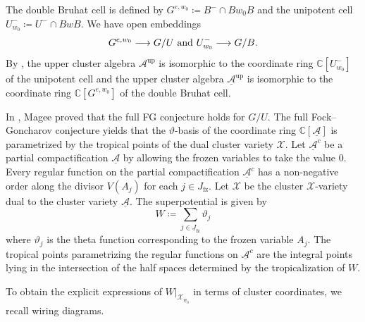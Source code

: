 \documentclass[11pt]{amsart}
\theoremstyle{plain}
\theoremstyle{definition}
\theoremstyle{remark}
\newcommand{\C}{\mathbb{C}}
\numberwithin{equation}{section} \numberwithin{table}{section}
\def\to{\mathchoice{\longrightarrow}{\rightarrow}{\rightarrow}{\rightarrow}}
\numberwithin{equation}{section}
\begin{document}
The double Bruhat cell is defined by $G^{e, w_0} \coloneqq B^{-} \cap Bw_0B$ and the unipotent cell $U^-_{w_0} \coloneqq U^{-} \cap BwB$. We have open embeddings
$$
G^{e, w_0} \to G / U \mbox{ and } U^-_{w_0} \to G / B.
$$
By \cite{BFZ05, FO25}, the upper cluster algebra $\mathcal{A}^\mathrm{up}$ is isomorphic to the coordinate ring $\C[U^-_{w_0}]$ of the unipotent cell and the upper cluster algebra $\underline{\mathcal{A}}^\mathrm{up}$ is isomorphic to   the coordinate ring $\C[G^{e,w_0}]$ of the double Bruhat cell.

In \cite{Mag15}, Magee proved that the full FG conjecture holds for $G/U$. The full Fock--Goncharov conjecture \cite[Definition 0.6]{GHKK18} yields that the $\vartheta$-basis of the coordinate ring $\C[\underline{\mathcal{A}}]$ is parametrized by the tropical points of the dual cluster variety $\mathcal{X}$. Let ${\underline{\mathcal{A}}^c}$ be a partial compactification $\underline{\mathcal{A}}$ by allowing the frozen variables to take the value $0$. Every regular function on the partial compactification ${\underline{\mathcal{A}}^c}$ has a non-negative order along the divisor $V(A_j)$ for each $j \in J_\mathrm{fz}$. Let $\mathcal{X}$ be the cluster $\mathcal{X}$-variety dual to the cluster variety $\underline{\mathcal{A}}$. The superpotential is given by 
\begin{equation}\label{equ_Wtheta}
W \coloneqq \sum_{j \in \underline{J}_\mathrm{fz}} \vartheta_j
\end{equation}
where $\vartheta_j$ is the theta function corresponding to the frozen variable $A_j$. The tropical points parametrizing the regular functions on ${\underline{\mathcal{A}}^c}$ are the integral points lying in the intersection of the half spaces determined by the tropicalization of $W$. 

To obtain the explicit expressions of $W|_{\mathcal{X}_{\underline{w}_0}}$ in terms of cluster coordinates, we recall wiring diagrams.
\end{document}
